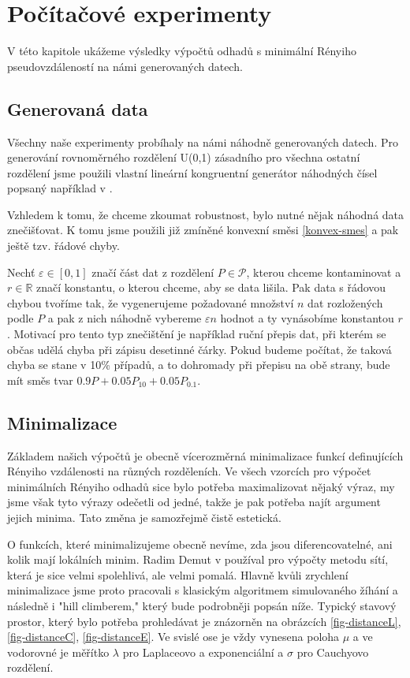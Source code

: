 \chapter{Počítačové experimenty}

V této kapitole ukážeme výsledky výpočtů odhadů s minimální Rényiho pseudovzdáleností na námi generovaných datech. 

\section{Generovaná data}
Všechny naše experimenty probíhaly na námi náhodně generovaných datech. Pro generování rovnoměrného rozdělení U(0,1) zásadního pro všechna ostatní rozdělení jsme použili vlastní lineární kongruentní generátor náhodných čísel popsaný například v \cite{Virius98}. 

Vzhledem k tomu, že chceme zkoumat robustnost, bylo nutné nějak  náhodná data znečišťovat. K tomu jsme použili již zmíněné konvexní směsi \eqref{konvex-smes} a pak ještě tzv. řádové chyby. 

Nechť $\varepsilon \in [0,1]$ značí část dat z rozdělení $P \in \mathcal{P}$, kterou chceme kontaminovat a $r \in \mathbb{R}$ značí konstantu, o kterou chceme, aby se data lišila. Pak data s řádovou chybou tvoříme tak, že vygenerujeme požadované množství $n$ dat rozložených podle $P$ a pak z nich náhodně vybereme $\varepsilon n$ hodnot a ty vynásobíme konstantou $r$. Motivací pro tento typ znečištění je například ruční přepis dat, při kterém se občas udělá chyba při zápisu desetinné čárky. Pokud budeme počítat, že taková chyba se stane v 10\% případů, a to dohromady při přepisu na obě strany, bude mít směs tvar $0.9P + 0.05P_{10} + 0.05P_{0.1}$.

\section{Minimalizace}
Základem našich výpočtů je obecně vícerozměrná minimalizace funkcí definujících Rényiho vzdálenosti na různých rozděleních. Ve všech vzorcích pro výpočet minimálních Rényiho odhadů sice bylo potřeba maximalizovat nějaký výraz, my jsme však tyto výrazy odečetli od jedné, takže je pak potřeba najít argument jejich minima. Tato změna je samozřejmě čistě estetická.

O funkcích, které minimalizujeme obecně nevíme, zda jsou diferencovatelné, ani kolik mají lokálních minim. Radim Demut v \cite{Demut2010} používal pro výpočty metodu sítí, která je sice velmi spolehlivá, ale velmi pomalá. Hlavně kvůli zrychlení minimalizace jsme proto pracovali s klasickým algoritmem simulovaného žíhání a následně i "hill climberem," který bude podrobněji popsán níže. Typický stavový prostor, který bylo potřeba prohledávat je znázorněn na obrázcích \ref{fig-distanceL}, \ref{fig-distanceC}, \ref{fig-distanceE}. Ve svislé ose je vždy vynesena poloha $\mu$ a ve vodorovné je měřítko $\lambda$ pro Laplaceovo a exponenciální a $\sigma$ pro Cauchyovo rozdělení.

